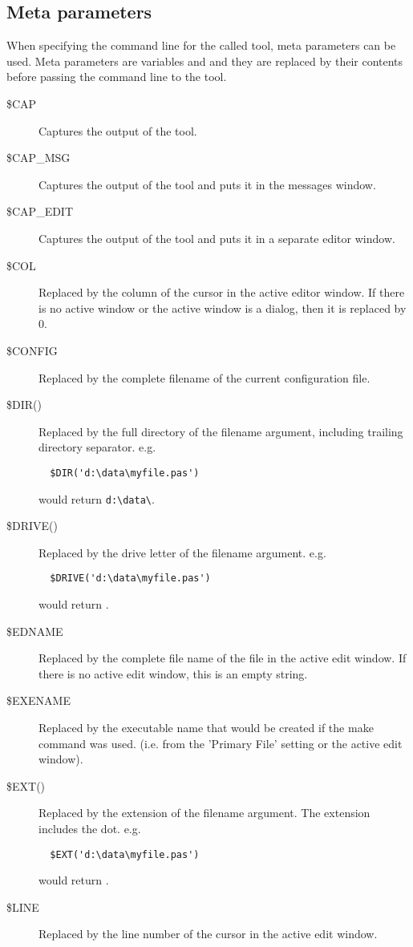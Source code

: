 \subsection{Meta parameters}
When specifying the command line for the called tool, meta parameters can
be used. Meta parameters are variables and and they are replaced
by their contents before passing the command line to the tool.

\begin{description}
\item[\$CAP]
Captures the output of the tool.
\item[\$CAP\_MSG]
Captures the output of the tool and puts it in the messages window.
\item[\$CAP\_EDIT]
Captures the output of the tool and puts it in a separate editor window.
\item[\$COL]
Replaced by the column of the cursor in the active editor window. If there is no
 active window or the active window is a dialog, then it is replaced by 0.
\item[\$CONFIG]
Replaced by the complete filename of the current configuration file.
\item[\$DIR()]
Replaced by the full directory of the filename argument, including trailing
directory separator. e.g.
\begin{verbatim}
  $DIR('d:\data\myfile.pas')
\end{verbatim}
would return \verb|d:\data\|.
\item[\$DRIVE()]
Replaced by the drive letter of the filename argument. e.g.
\begin{verbatim}
  $DRIVE('d:\data\myfile.pas')
\end{verbatim}
would return .
\item[\$EDNAME]
Replaced by the complete file name of the file in the active edit window.
If there is no active edit window, this is an empty string.
\item[\$EXENAME]
Replaced by the executable name that would be created if the make command
was used. (i.e. from the 'Primary File' setting or the active edit window).
\item[\$EXT()]
Replaced by the extension of the filename argument.
The extension includes the dot.
e.g.
\begin{verbatim}
  $EXT('d:\data\myfile.pas')
\end{verbatim}
would return .
\item[\$LINE]
Replaced by the line number of the cursor in the active edit window.

\end{description}
